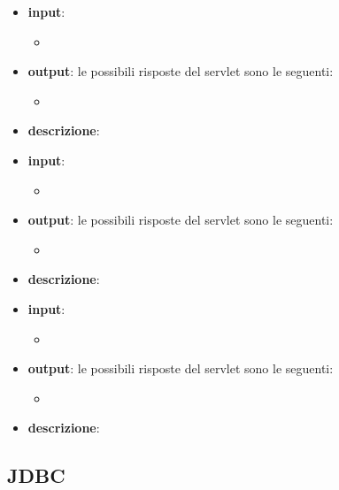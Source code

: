 
\begin{itemize}
	\item \textbf{input}:
		\begin{itemize}
			\item
		\end{itemize}
	\item \textbf{output}: le possibili risposte del servlet sono le seguenti:
		\begin{itemize}
			\item
		\end{itemize}
	\item \textbf{descrizione}:
\end{itemize}


\begin{itemize}
	\item \textbf{input}:
		\begin{itemize}
			\item
		\end{itemize}
	\item \textbf{output}: le possibili risposte del servlet sono le seguenti:
		\begin{itemize}
			\item
		\end{itemize}
	\item \textbf{descrizione}:
\end{itemize}


\begin{itemize}
	\item \textbf{input}:
		\begin{itemize}
			\item
		\end{itemize}
	\item \textbf{output}: le possibili risposte del servlet sono le seguenti:
		\begin{itemize}
			\item
		\end{itemize}
	\item \textbf{descrizione}:
\end{itemize}

\subsection{JDBC}

